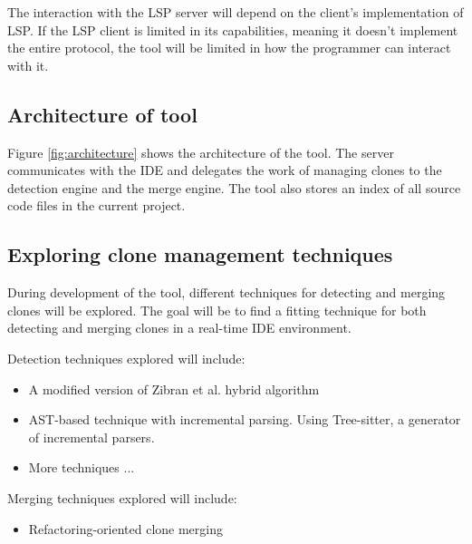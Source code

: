 \documentclass[12pt]{article}
\begin{document}
The interaction with the LSP server will depend on the client's implementation of LSP. If
the LSP client is limited in its capabilities, meaning it doesn't implement the entire
protocol, the tool will be limited in how the programmer can interact with it.

\subsection{Architecture of tool}

Figure \ref{fig:architecture} shows the architecture of the tool. The server communicates
with the IDE and delegates the work of managing clones to the detection engine and the
merge engine. The tool also stores an index of all source code files in the current project.

\subsection{Exploring clone management techniques}

During development of the tool, different techniques for detecting and merging clones will
be explored. The goal will be to find a fitting technique for both detecting and merging
clones in a real-time IDE environment. 

Detection techniques explored will include:

\begin{itemize}
	\item A modified version of Zibran et al. hybrid algorithm\cite{Zibran_real_time_search}
    \item AST-based technique with incremental parsing. Using Tree-sitter, a generator of
        incremental parsers\cite{treesitter}.
    \item More techniques ...
\end{itemize}

Merging techniques explored will include:

\begin{itemize}
    \item Refactoring-oriented clone merging\cite{RefactoringOrientedClonesAndMerging}
\end{itemize}
\end{document}
